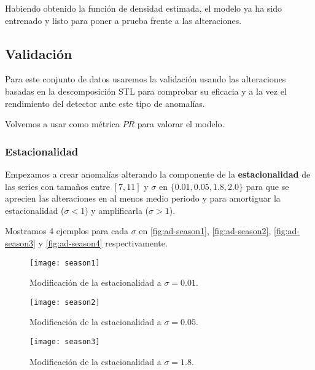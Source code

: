 Habiendo obtenido la función de densidad estimada, el modelo ya ha sido entrenado y listo para poner a prueba frente a las alteraciones.

\subsection{Validación}

Para este conjunto de datos usaremos la validación usando las alteraciones basadas en la descomposición STL para comprobar su eficacia y a la vez el rendimiento del detector ante este tipo de anomalías.

Volvemos a usar como métrica $PR$ para valorar el modelo.

\subsubsection{Estacionalidad}

Empezamos a crear anomalías alterando la componente de la \textbf{estacionalidad} de las series con tamaños entre $[7, 11]$ y $\sigma$ en $\{0.01, 0.05, 1.8, 2.0\}$ para que se aprecien las alteraciones en al menos medio periodo y para amortiguar la estacionalidad ($\sigma < 1$) y amplificarla ($\sigma > 1$).

Mostramos 4 ejemplos para cada $\sigma$ en \autoref{fig:ad-season1}, \autoref{fig:ad-season2}, \autoref{fig:ad-season3} y \autoref{fig:ad-season4} respectivamente.

\begin{figure}[htpb]
  \centering
  \texttt{[image: season1]}
  \caption{Modificación de la estacionalidad a $\sigma = 0.01$.}
  \label{fig:ad-season1}
\end{figure}

\begin{figure}[htpb]
  \centering
  \texttt{[image: season2]}
  \caption{Modificación de la estacionalidad a $\sigma = 0.05$.}
  \label{fig:ad-season2}
\end{figure}

\begin{figure}[htpb]
  \centering
  \texttt{[image: season3]}
  \caption{Modificación de la estacionalidad a $\sigma = 1.8$.}
  \label{fig:ad-season3}
\end{figure}

